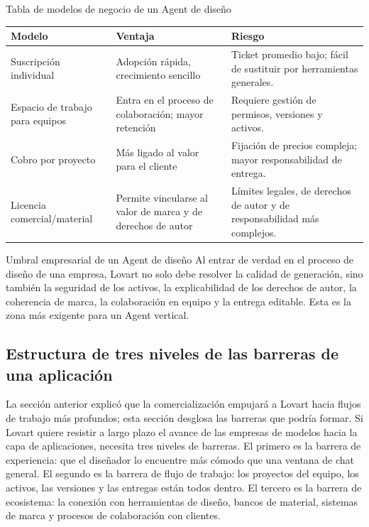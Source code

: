 \documentclass[a4paper]{article}
\begin{document}
\begin{knowledgebox}{Tabla de modelos de negocio de un Agent de diseño}
\begin{tabularx}{\textwidth}{p{}p{}X}
\toprule
Modelo & Ventaja & Riesgo \\
\midrule
Suscripción individual & Adopción rápida, crecimiento sencillo & Ticket promedio bajo; fácil de sustituir por herramientas generales. \\
Espacio de trabajo para equipos & Entra en el proceso de colaboración; mayor retención & Requiere gestión de permisos, versiones y activos. \\
Cobro por proyecto & Más ligado al valor para el cliente & Fijación de precios compleja; mayor responsabilidad de entrega. \\
Licencia comercial/material & Permite vincularse al valor de marca y de derechos de autor & Límites legales, de derechos de autor y de responsabilidad más complejos. \\
\bottomrule
\end{tabularx}
\end{knowledgebox}

\begin{importantbox}{Umbral empresarial de un Agent de diseño}
Al entrar de verdad en el proceso de diseño de una empresa, Lovart no solo debe resolver la calidad de generación, sino también la seguridad de los activos, la explicabilidad de los derechos de autor, la coherencia de marca, la colaboración en equipo y la entrega editable. Esta es la zona más exigente para un Agent vertical.
\end{importantbox}

\subsection{Estructura de tres niveles de las barreras de una aplicación}

La sección anterior explicó que la comercialización empujará a Lovart hacia flujos de trabajo más profundos; esta sección desglosa las barreras que podría formar. Si Lovart quiere resistir a largo plazo el avance de las empresas de modelos hacia la capa de aplicaciones, necesita tres niveles de barreras. El primero es la barrera de experiencia: que el diseñador lo encuentre más cómodo que una ventana de chat general. El segundo es la barrera de flujo de trabajo: los proyectos del equipo, los activos, las versiones y las entregas están todos dentro. El tercero es la barrera de ecosistema: la conexión con herramientas de diseño, bancos de material, sistemas de marca y procesos de colaboración con clientes.
\end{document}
